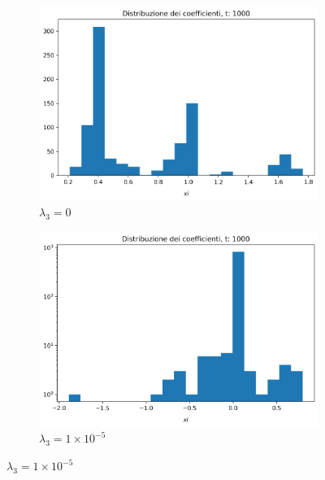 \documentclass[11pt]{article}
\begin{document}
\begin{figure}
\centering
\begin{subfigure}{.3\textwidth}
    \centering
  \includegraphics[width=1.\textwidth]{img/Xi_distrib_zero.png}  
	\caption{$\lambda_3 = 0$}
\end{subfigure}
\begin{subfigure}{.3\textwidth}
    \centering
  \includegraphics[width=1.\textwidth]{img/Xi_distribution_1000.png}  
  \caption{$\lambda_3 = 1 \times 10^{-5} $}


\end{subfigure}
\end{figure}
\end{document}
